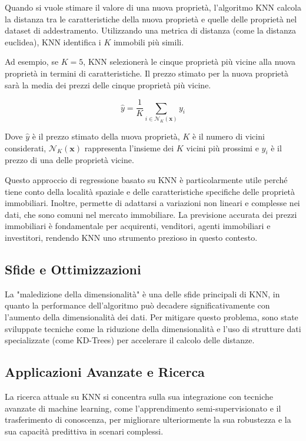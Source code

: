 Quando si vuole stimare il valore di una nuova proprietà, l'algoritmo KNN calcola la distanza tra le caratteristiche della nuova proprietà e quelle delle proprietà nel dataset di addestramento. Utilizzando una metrica di distanza (come la distanza euclidea), KNN identifica i \( K \) immobili più simili. 

Ad esempio, se \( K = 5 \), KNN selezionerà le cinque proprietà più vicine alla nuova proprietà in termini di caratteristiche. Il prezzo stimato per la nuova proprietà sarà la media dei prezzi delle cinque proprietà più vicine.

\[
\hat{y} = \frac{1}{K} \sum_{i \in \mathcal{N}_K(\mathbf{x})} y_i
\]

Dove \( \hat{y} \) è il prezzo stimato della nuova proprietà, \( K \) è il numero di vicini considerati, \( \mathcal{N}_K(\mathbf{x}) \) rappresenta l'insieme dei \( K \) vicini più prossimi e \( y_i \) è il prezzo di una delle proprietà vicine.

Questo approccio di regressione basato su KNN è particolarmente utile perché tiene conto della località spaziale e delle caratteristiche specifiche delle proprietà immobiliari. Inoltre, permette di adattarsi a variazioni non lineari e complesse nei dati, che sono comuni nel mercato immobiliare. La previsione accurata dei prezzi immobiliari è fondamentale per acquirenti, venditori, agenti immobiliari e investitori, rendendo KNN uno strumento prezioso in questo contesto.


\subsection{Sfide e Ottimizzazioni}

La "maledizione della dimensionalità" è una delle sfide principali di KNN, in quanto la 
performance dell'algoritmo può decadere significativamente con l'aumento della dimensionalità 
dei dati. Per mitigare questo problema, sono state sviluppate tecniche come la riduzione della 
dimensionalità e l'uso di strutture dati specializzate (come KD-Trees) per accelerare il calcolo 
delle distanze.

\subsection{Applicazioni Avanzate e Ricerca}

La ricerca attuale su KNN si concentra sulla sua integrazione con tecniche avanzate di 
machine learning, come l'apprendimento semi-supervisionato e il trasferimento di conoscenza, 
per migliorare ulteriormente la sua robustezza e la sua capacità predittiva in scenari complessi.

